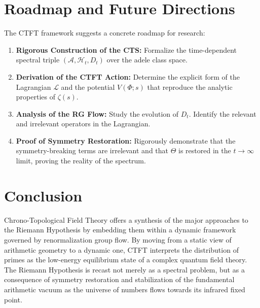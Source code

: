 \documentclass[11pt, a4paper]{article}
\theoremstyle{definition}
\newcommand{\Lagr}{\mathcal{L}}
\newcommand{\Hilb}{\mathcal{H}}
\newcommand{\Alg}{\mathscr{A}}
\begin{document}
\section{Roadmap and Future Directions}
The CTFT framework suggests a concrete roadmap for research:
\begin{enumerate}
    \item \textbf{Rigorous Construction of the CTS:} Formalize the time-dependent spectral triple $(\Alg, \Hilb_t, D_t)$ over the adele class space.
    \item \textbf{Derivation of the CTFT Action:} Determine the explicit form of the Lagrangian $\Lagr$ and the potential $V(\Phi; s)$ that reproduce the analytic properties of $\zeta(s)$.
    \item \textbf{Analysis of the RG Flow:} Study the evolution of $D_t$. Identify the relevant and irrelevant operators in the Lagrangian.
    \item \textbf{Proof of Symmetry Restoration:} Rigorously demonstrate that the symmetry-breaking terms are irrelevant and that $\Theta$ is restored in the $t\to\infty$ limit, proving the reality of the spectrum.
\end{enumerate}

\section{Conclusion}
Chrono-Topological Field Theory offers a synthesis of the major approaches to the Riemann Hypothesis by embedding them within a dynamic framework governed by renormalization group flow. By moving from a static view of arithmetic geometry to a dynamic one, CTFT interprets the distribution of primes as the low-energy equilibrium state of a complex quantum field theory. The Riemann Hypothesis is recast not merely as a spectral problem, but as a consequence of symmetry restoration and stabilization of the fundamental arithmetic vacuum as the universe of numbers flows towards its infrared fixed point.
\end{document}
